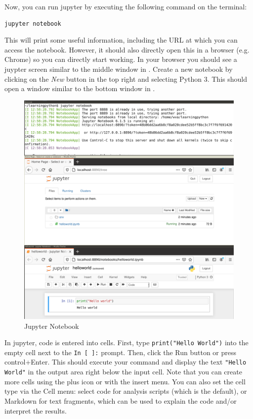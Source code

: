 Now, you can run jupyter by executing the following command on the terminal:

\begin{verbatim}
jupyter notebook
\end{verbatim}

This will print some useful information, including the URL at which you can access the notebook.
However, it should also directly open this in a browser (e.g. Chrome) so you can directly start working. 
In your browser you should see a juypter screen similar to the middle window in .
Create a new notebook by clicking on the \emph{New} button in the top right and selecting Python 3.
This should open a window similar to the bottom window in .

\begin{figure}
  \includegraphics[width=\textwidth]{figures/jupyter.png}
  \caption{Jupyter Notebook}\label{fig:jupyter}
\end{figure}

In jupyter, code is entered into cells.
First, type \verb|print("Hello World")| into the empty cell next to the \verb|In [ ]:| prompt.
Then, click the Run button or press control+Enter. This should execute your command and display
the text \verb|"Hello World"| in the output area right below the input cell.
Note that you can create more cells using the plus icon or with the insert menu.
You can also set the cell type via the Cell menu: select code for analysis scripts (which is the default),
or Markdown for text fragments, which can be used to explain the code and/or interpret the results.

